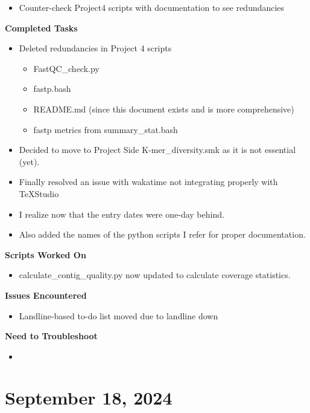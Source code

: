 \documentclass[11pt]{report}
\newcommand{\done}{\checkmark}
\begin{document}
{\begin{itemize}
\begin{itemize}
	
\end{itemize}
	\item [\done] Counter-check Project4 scripts with documentation to see redundancies
\end{itemize}

\textbf{Completed Tasks}
\begin{itemize}
	\item [\done] Deleted redundancies in Project 4 scripts 
		\begin{itemize}
			\item FastQC\_check.py
			\item fastp.bash
			\item README.md (since this document exists and is more comprehensive)
			\item fastp metrics from summary\_stat.bash
		\end{itemize}
	\item [\done] Decided to move to Project Side K-mer\_diversity.smk as it is not essential (yet). 
	\item [\done] Finally resolved an issue with wakatime not integrating properly with TeXStudio
	\item [\done] I realize now that the entry dates were one-day behind.  
	\item [\done] Also added the names of the python scripts I refer for proper documentation. 
\end{itemize}

\textbf{Scripts Worked On}
\begin{itemize}
	\item calculate\_contig\_quality.py now updated to calculate coverage statistics. 
\end{itemize}


\textbf{Issues Encountered}
\begin{itemize}
	\item Landline-based to-do list moved due to landline down 
\end{itemize}

\textbf{Need to Troubleshoot}
\begin{itemize}
	\item 
\end{itemize}

\newpage


\section{September 18, 2024}

}
\end{document}
